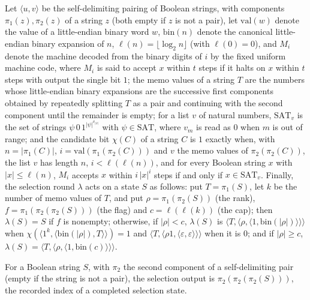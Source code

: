 \begin{definition}
\label{Complexity.ladner_selectStep}
\leanok
{}
Let $\langle u,v\rangle$ be the self-delimiting pairing of Boolean strings, with components $\pi_1(z),\pi_2(z)$ of a string $z$ (both empty if $z$ is not a pair), let $\mathrm{val}(w)$ denote the value of a little-endian binary word $w$, $\mathrm{bin}(n)$ denote the canonical little-endian binary expansion of $n$, $\ell(n)=\lfloor\log_2 n\rfloor$ (with $\ell(0)=0$), and $M_i$ denote the machine decoded from the binary digits of $i$ by the fixed uniform machine code, where $M_i$ is said to accept $x$ within $t$ steps if it halts on $x$ within $t$ steps with output the single bit $1$; the memo values of a string $T$ are the numbers whose little-endian binary expansions are the successive first components obtained by repeatedly splitting $T$ as a pair and continuing with the second component until the remainder is empty; for a list $v$ of natural numbers, $\mathrm{SAT}_v$ is the set of strings $\psi\,0\,1^{|\psi|^{v_{|\psi|}}}$ with $\psi\in\mathrm{SAT}$, where $v_m$ is read as $0$ when $m$ is out of range; and the candidate bit $\chi(C)$ of a string $C$ is $1$ exactly when, with $n=|\pi_1(C)|$, $i=\mathrm{val}(\pi_1(\pi_2(C)))$ and $v$ the memo values of $\pi_2(\pi_2(C))$, the list $v$ has length $n$, $i<\ell(\ell(n))$, and for every Boolean string $x$ with $|x|\le\ell(n)$, $M_i$ accepts $x$ within $i\,|x|^i$ steps if and only if $x\in\mathrm{SAT}_v$. Finally,
the selection round $\lambda$ acts on a state $S$ as follows: put $T=\pi_1(S)$, let $k$ be the number of memo values of $T$, and put $\rho=\pi_1(\pi_2(S))$ (the rank), $f=\pi_1(\pi_2(\pi_2(S)))$ (the flag) and $c=\ell(\ell(k))$ (the cap); then $\lambda(S)=S$ if $f$ is nonempty; otherwise, if $|\rho|<c$, $\lambda(S)$ is $\langle T,\langle\rho,\langle 1,\mathrm{bin}(|\rho|)\rangle\rangle\rangle$ when $\chi(\langle 1^{k},\langle\mathrm{bin}(|\rho|),T\rangle\rangle)=1$ and $\langle T,\langle\rho1,\langle\varepsilon,\varepsilon\rangle\rangle\rangle$ when it is $0$; and if $|\rho|\ge c$, $\lambda(S)=\langle T,\langle\rho,\langle 1,\mathrm{bin}(c)\rangle\rangle\rangle$.
\end{definition}

\begin{definition}
\label{Complexity.ladner_selectOut}
\leanok
{}
For a Boolean string $S$, with $\pi_2$ the second component of a self-delimiting pair (empty if
the string is not a pair), the selection output is $\pi_2(\pi_2(\pi_2(S)))$, the recorded index of
a completed selection state.
\end{definition}

